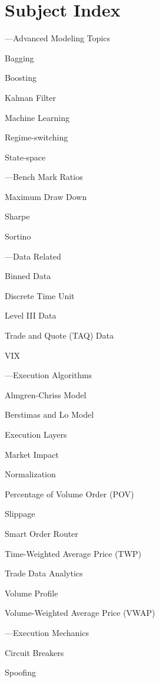 \chapter*{Subject Index}
\nopagebreak
\begin{minipage}{0.40\textwidth}
\noindent ---Advanced Modeling Topics
	\begin{flushright}
	Bagging \par
	Boosting \par
	Kalman Filter \par
	Machine Learning \par
	Regime-switching \par
	State-space 
	\end{flushright}


\noindent ---Bench Mark Ratios
	\begin{flushright}
	Maximum Draw Down \par
	Sharpe \par
	Sortino
	\end{flushright}


\noindent ---Data Related
	\begin{flushright}
	Binned Data \par
	Discrete Time Unit \par
	Level III Data \par
	Trade and Quote (TAQ) Data \par 
	VIX
	\end{flushright}


\noindent ---Execution Algorithms
	\begin{flushright}
	Almgren-Chriss Model \par
	Berstimas and Lo Model \par
	Execution Layers \par
	Market Impact \par
	Normalization \par
	Percentage of Volume Order (POV) \par
	Slippage \par
	Smart Order Router \par
	Time-Weighted Average Price (TWP) \par
	Trade Data Analytics \par
	Volume Profile \par
	Volume-Weighted Average Price (VWAP)
	\end{flushright}


\noindent ---Execution Mechanics
	\begin{flushright}
	Circuit Breakers \par
	Spoofing
	\end{flushright}
\end{minipage} \hfill
